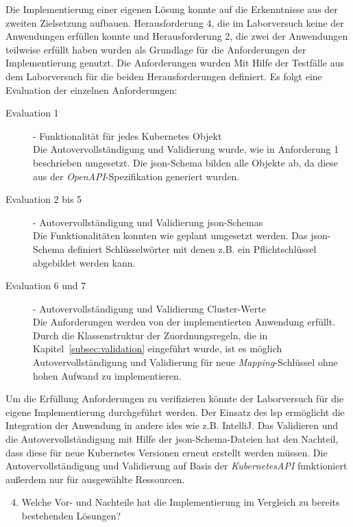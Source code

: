 Die Implementierung einer eigenen Lösung konnte auf die Erkenntnisse aus der zweiten Zielsetzung aufbauen.
Herausforderung 4, die im Laborversuch keine der Anwendungen erfüllen konnte und Herausforderung 2, die zwei der Anwendungen teilweise erfüllt haben
wurden als Grundlage für die Anforderungen der Implementierung genutzt.
Die Anforderungen wurden Mit Hilfe der Testfälle aus dem Laborversuch für die beiden Herausforderungen definiert.
Es folgt eine Evaluation der einzelnen Anforderungen:
\begin{description}
    \item[Evaluation 1]{- Funktionalität für jedes Kubernetes Objekt\\}
          Die Autovervollständigung und Validierung wurde, wie in Anforderung 1 beschrieben umgesetzt.
          Die \ac{json}-Schema bilden alle Objekte ab, da diese aus der \textit{OpenAPI}-Spezifikation generiert wurden.
    \item[Evaluation 2 bis 5]{- Autovervollständigung und Validierung \ac{json}-Schemas\\}
          Die Funktionalitäten konnten wie geplant umgesetzt werden. Das \ac{json}-Schema
          definiert Schlüsselwörter mit denen z.B. ein Pflichtschlüssel abgebildet werden kann.
    \item[Evaluation 6 und 7]{- Autovervollständigung und Validierung Cluster-Werte\\}
          Die Anforderungen werden von der implementierten Anwendung erfüllt.
          Durch die Klassenstruktur der Zuordnungsregeln, die in Kapitel~\ref{subsec:validation} eingeführt wurde, ist
          es möglich Autovervollständigung und Validierung für neue \textit{Mapping}-Schlüssel ohne hohen Aufwand zu implementieren.

\end{description}
Um die Erfüllung Anforderungen zu verifizieren könnte der Laborversuch für die eigene Implementierung durchgeführt werden.
Der Einsatz des \ac{lsp} ermöglicht die Integration der Anwendung in andere \ac{ide}s wie z.B. IntelliJ.
Das Validieren und die Autovervollständigung mit Hilfe der \ac{json}-Schema-Dateien hat den Nachteil, dass diese für neue Kubernetes Versionen
erneut erstellt werden müssen.
Die Autovervollständigung und Validierung auf Basis der \textit{KubernetesAPI} funktioniert außerdem nur für ausgewählte Ressourcen.

\begin{enumerate}
    \setcounter{enumi}{3}
    \item Welche Vor- und Nachteile hat die Implementierung im Vergleich zu bereits bestehenden Lösungen?
\end{enumerate}

